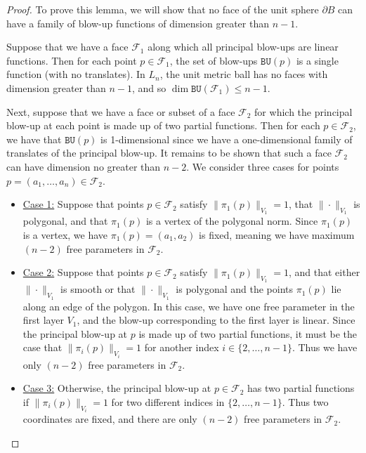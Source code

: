 \documentclass{article}
\theoremstyle{definition}
\newcommand{\BU}{\mathtt{BU}}
\newcommand{\norm}[1]{\|#1\|}
\newcommand{\bhor}{\partial_h}
\newcommand{\cF}{{\mathcal F}}
\begin{document}
\begin{proof}

To prove this lemma, we will show that no face of the unit sphere $\partial B$ can have a family of blow-up functions of dimension greater than $n-1$.

Suppose that we have a face $\cF_1$ along which all principal blow-ups are linear functions. Then for each point $p \in \cF_1$, the set of blow-ups $\BU(p)$ is a single function (with no translates). In $L_n$, the unit metric ball has no faces with dimension greater than $n-1$, and so $\dim \BU(\cF_1) \leq n-1$.

Next, suppose that we have a face or subset of a face $\cF_2$ for which the principal blow-up at each point is made up of two partial functions. Then for each $p \in \cF_2$, we have that $\BU(p)$ is 1-dimensional since we have a one-dimensional family of translates of the principal blow-up. It remains to be shown that such a face $\cF_2$ can have dimension no greater than $n-2$. We consider three cases for points $p= (a_1, \ldots, a_n) \in \cF_2$. 
\begin{itemize}
\item \underline{Case 1:} Suppose that points $p \in \cF_2$ satisfy $\norm{\pi_1(p)}_{V_1} = 1$, that $\norm{\cdot}_{V_1}$ is polygonal, and that $\pi_1(p)$ is a vertex of the polygonal norm. Since $\pi_1(p)$ is a vertex, we have $\pi_1(p) = (a_1, a_2)$ is fixed, meaning we have maximum $(n-2)$ free parameters in $\cF_2$.

\item \underline{Case 2:} Suppose that points $p \in \cF_2$ satisfy $\norm{\pi_1(p)}_{V_1} = 1$, and that either $\norm{\cdot}_{V_1}$ is smooth or that $\norm{\cdot}_{V_1}$ is polygonal and the points $\pi_1(p)$ lie along an edge of the polygon. In this case, we have one free parameter in the first layer $V_1$, and the blow-up corresponding to the first layer is linear. Since the principal blow-up at $p$ is made up of two partial functions, it must be the case that $\norm{\pi_i(p)}_{V_i} = 1$ for another index $i \in \{2, \ldots, n-1\}$. Thus we have only $(n-2)$ free parameters in $\cF_2$.

\item \underline{Case 3:} Otherwise, the principal blow-up at $p \in \cF_2$ has two partial functions if $\norm{\pi_i(p)}_{V_i} = 1$ for two different indices in $\{2, \ldots, n-1\}.$ Thus two coordinates are fixed, and there are only $(n-2)$ free parameters in $\cF_2$. 
\end{itemize}


\end{proof}
\end{document}
